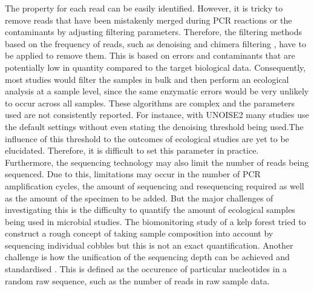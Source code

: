 \documentclass[11pt, a4paper]{article}
\begin{document}
The property  for each read can be easily identified.  However, it is tricky to remove reads that have been mistakenly merged during PCR reactions or the contaminants by adjusting filtering parameters. Therefore, the filtering methods based on the frequency of reads, such as denoising \cite{Edgar2016b} and chimera filtering \cite{Edgar2011,Edgar2016}, have to be applied to remove them. This is based on errors and contaminants that are potentially low in quantity compared to the target biological data. Consequently, most studies would filter the samples in bulk and then perform an ecological analysis at a sample level, since the same enzymatic errors would be very unlikely to occur across all samples. These algorithms are complex and the parameters used are not consistently reported.  For instance, with UNOISE2 many studies  use the default settings without even stating the denoising threshold being used.The influence of this threshold to the outcomes of ecological studies are yet to be elucidated. Therefore, it is difficult to set this parameter in practice. 
Furthermore, the sequencing technology may also limit the number of reads being sequenced. Due to this, limitations may occur in the number of PCR amplification cycles, the amount of sequencing and resequencing required as well as the amount of the specimen to be added. But the major challenges of investigating this is the difficulty to quantify the amount of ecological samples being used in microbial studies. The biomonitoring study of a kelp forest tried to construct a rough concept of taking sample composition into account by sequencing individual cobbles \cite{Shum2019} but this is not an exact quantification. Another challenge is how the unification of the sequencing depth can be achieved and standardised \cite{Lundin2012}. This is defined as the occurence of particular nucleotides in a random raw sequence, such as the number of reads in raw sample data. 
\end{document}
